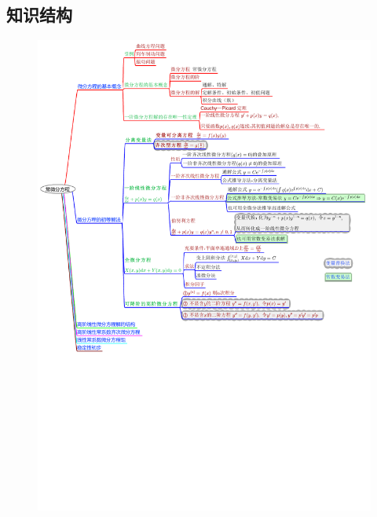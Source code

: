 \documentclass[12pt,UTF8,fleqn]{ctexart}
\begin{document}
\subsection{知识结构}
\begin{figure}[H]
\begin{center}
\includegraphics[height=1\textheight]{20190615.pdf}
\end{center}
\end{figure}
\end{document}
